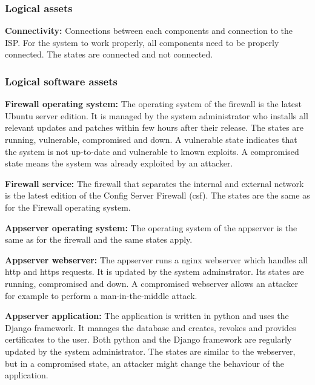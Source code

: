 \documentclass[english]{article}
\begin{document}
\subsubsection{Logical assets}
	\begin{description}
		\item{\textbf{Connectivity:}} Connections between each components and connection to the ISP. For the system to work properly, all components need to be properly connected. The states are connected and not connected.
	\end{description}

\subsubsection{Logical software assets}

	\begin{description}
		\item{\textbf{Firewall operating system:}} The operating system of the firewall is the latest Ubuntu server edition. It is managed by the system administrator who installs all relevant updates and patches within few hours after their release. The states are running, vulnerable, compromised and down. A vulnerable state indicates that the system is not up-to-date and vulnerable to known exploits. A compromised state means the system was already exploited by an attacker.
		\item{\textbf{Firewall service:}} The firewall that separates the internal and external network is the latest edition of the Config Server Firewall (csf). The states are the same as for the Firewall operating system.
		\item{\textbf{Appserver operating system:}} The operating system of the appserver is the same as for the firewall and the same states apply.
		\item{\textbf{Appserver webserver:}} The appserver runs a nginx webserver which handles all http and https requests. It is updated by the system adminstrator. Its states are running, compromised and down. A compromised webserver allows an attacker for example to perform a man-in-the-middle attack.
		\item{\textbf{Appserver application:}} The application is written in python and uses the Django framework. It manages the database and creates, revokes and provides certificates to the user. Both python and the Django framework are regularly updated by the system administrator. The states are similar to the webserver, but in a compromised state, an attacker might change the behaviour of the application.

\end{description}
\end{document}
